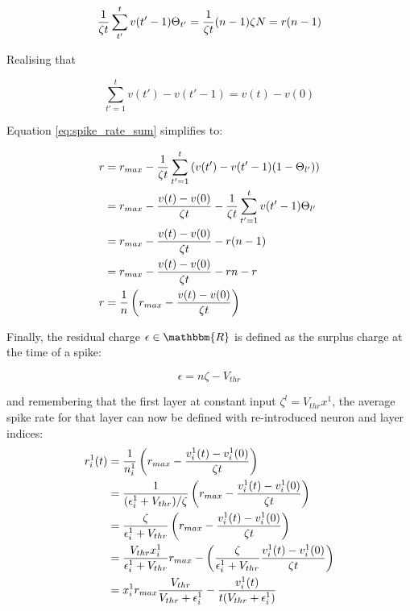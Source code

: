 \begin{equation}
{1 \over \zeta t} \sum_{t'}^tv(t' - 1)\Theta_{t'} = {1 \over \zeta t}(n - 1)\zeta N = r(n - 1)
\label{eq:time_threshold}
\end{equation}

\noindent
Realising that

\begin{equation}
\sum_{t'=1}^tv(t') - v(t' - 1) = v(t) - v(0)
\label{eq:sum_index_shuffle}
\end{equation}

\noindent
Equation \ref{eq:spike_rate_sum} simplifies to:

\begin{equation}
\begin{split}
r    &= r_{max} - {1 \over \zeta t} \sum_{t'=1}^t \left(v(t') - v(t' - 1)(1 - \Theta_{l'})\right) \\
     &= r_{max} - {v(t) - v(0) \over \zeta t} - {1 \over \zeta t} \sum_{t'=1}^t v(t' - 1)\Theta_{l'}\\
     &= r_{max} - {v(t) - v(0) \over \zeta t} - r(n - 1)\\
     &= r_{max} - {v(t) - v(0) \over \zeta t} - rn - r\\
r &= {1 \over n} \left(r_{max} - {v(t) - v(0) \over \zeta t}\right)
\end{split}
\label{eq:spike_rate}
\end{equation}

Finally, the residual charge $\epsilon \in \mathbbm{R}$ is defined as the surplus charge at the time of
a spike:

\begin{equation}
\epsilon = n\zeta - V_{thr}
\label{eq:charge_surplus}
\end{equation}

\noindent
and remembering that the first layer at constant input $\zeta^l = V_{thr}x^1$, the average spike rate
for that layer can now be defined with re-introduced neuron and layer indices:
\begin{equation}
\begin{split}
r_i^1(t) &= {1 \over n_i^1} \left(r_{max} - {v_i^1(t) - v_i^1(0) \over \zeta t}\right) \\
         &= {1 \over {(\epsilon_i^1 + V_{thr}) / \zeta}} \left(r_{max} - {v_i^1(t) - v_i^1(0) \over \zeta t}\right) \\
         &= {\zeta \over \epsilon_i^1 + V_{thr}} \left(r_{max} - {v_i^1(t) - v_i^1(0) \over \zeta t}\right) \\
         &= {V_{thr} x_i^1  \over \epsilon_i^1 + V_{thr}} r_{max}
          - \left({\zeta \over \epsilon_i^1 + V_{thr}} {v_i^1(t) - v_i^1(0) \over \zeta t}\right) \\
         &= x_i^1 r_{max} {V_{thr} \over V_{thr} + \epsilon_i^1 } - {v_i^1(t) \over t (V_{thr} + \epsilon_i^1) } \\
\end{split}
\label{eq:spike_conversion_appendix}
\end{equation}

